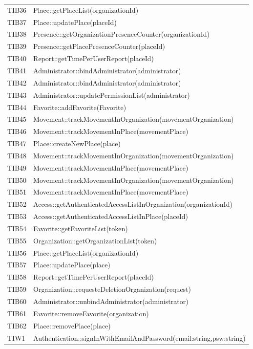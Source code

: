 {\begin{longtable}{C{2cm} C{12cm}}
	TIB36 & Place::getPlaceList(organizationId) \\
	TIB37 & Place::updatePlace(placeId) \\
	TIB38 & Presence::getOrganizationPresenceCounter(organizationId) \\
	TIB39 & Presence::getPlacePresenceCounter(placeId) \\
	TIB40 & Report::getTimePerUserReport(placeId)\\
	TIB41 & Administrator::bindAdministrator(administrator) \\
	TIB42 & Administrator::bindAdministrator(administrator) \\
	TIB43 & Administrator::updatePermissionList(administrator) \\
	TIB44 & Favorite::addFavorite(Favorite) \\
	TIB45 & Movement::trackMovementInOrganization(movementOrganization) \\
	TIB46 & Movement::trackMovementInPlace(movementPlace) \\
	TIB47 & Place::createNewPlace(place)\\
	TIB48 & Movement::trackMovementInOrganization(movementOrganization) \\
	TIB49 & Movement::trackMovementInPlace(movementPlace) \\
	TIB50 & Movement::trackMovementInOrganization(movementOrganization) \\
	TIB51 & Movement::trackMovementInPlace(movementPlace) \\
	TIB52 & Access::getAuthenticatedAccessListInOrganization(organizationId) \\
	TIB53 & Access::getAuthenticatedAccessListInPlace(placeId) \\
	TIB54 & Favorite::getFavoriteList(token) \\
	TIB55 & Organization::getOrganizationList(token) \\
	TIB56 & Place::getPlaceList(organizationId) \\
	TIB57 & Place::updatePlace(place) \\
	TIB58 & Report::getTimePerUserReport(placeId) \\
	TIB59 & Organization::requesteDeletionOrganization(request) \\
	TIB60 & Administrator::unbindAdministrator(administrator) \\
	TIB61 & Favorite::removeFavorite(organization) \\
	TIB62 & Place::removePlace(place) \\
	TIW1 & Authentication::signInWithEmailAndPassword(email:string,psw:string) \\

\end{longtable}}
